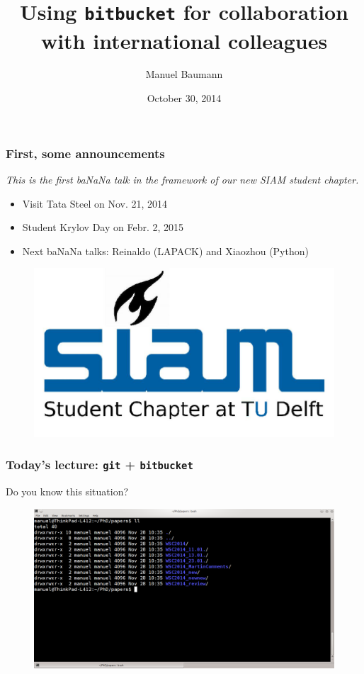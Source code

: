 \documentclass{beamer}
\title{\huge{Using \texttt{bitbucket} for collaboration with international colleagues}}
\author{Manuel Baumann}
\date{\footnotesize{October 30, 2014}}
\begin{document}
\frame{
\titlepage
}

\begin{frame}
\frametitle{First, some announcements}
\vspace{1cm}
\textit{This is the first ba\color{red}NaN\color{black}a talk in the framework of our new SIAM student chapter.}
\begin{itemize}
 \item Visit Tata Steel on Nov. 21, 2014
 \pause
 \item Student Krylov Day on Febr. 2, 2015
 \pause
 \item Next ba\color{red}NaN\color{black}a talks: Reinaldo (LAPACK) and Xiaozhou (Python)
\end{itemize}
\begin{figure}
\hfill \includegraphics[scale=0.12]{images/SSC_Delft_new}
\end{figure}

\end{frame}

\begin{frame}
\frametitle{Today's lecture: \texttt{git} + \texttt{bitbucket}}
Do you know this situation?
\begin{figure}
\centering
 \includegraphics[height=0.6\textheight]{images/screnshot1.png}
\end{figure}
\end{frame}
\end{document}
